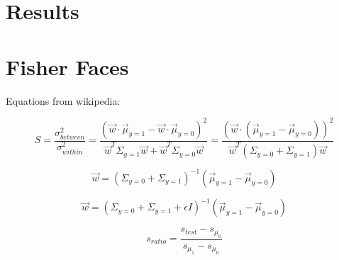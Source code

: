 \section{Results}




\section{Fisher Faces}

Equations from wikipedia:

\begin{equation}
S=\frac{\sigma_{between}^2}{\sigma_{within}^2}= \frac{(\vec w \cdot \vec \mu_{y=1} - \vec w \cdot \vec \mu_{y=0})^2}{\vec w^T \Sigma_{y=1} \vec w + \vec w^T \Sigma_{y=0} \vec w} = \frac{(\vec w \cdot (\vec \mu_{y=1} - \vec \mu_{y=0}))^2}{\vec w^T (\Sigma_{y=0}+\Sigma_{y=1}) \vec w}
\end{equation}

\begin{equation}
\vec w = (\Sigma_{y=0}+\Sigma_{y=1})^{-1}(\vec \mu_{y=1} - \vec \mu_{y=0})
\end{equation}

\begin{equation}
\vec w = (\Sigma_{y=0} + \Sigma_{y=1} + \epsilon I)^{-1}(\vec \mu_{y=1} - \vec \mu_{y=0})
\end{equation}


\begin{equation}
s_{ratio} = \frac{s_{test} - s_{\mu_0}}{s_{\mu_1} - s_{\mu_0}}
\end{equation}
